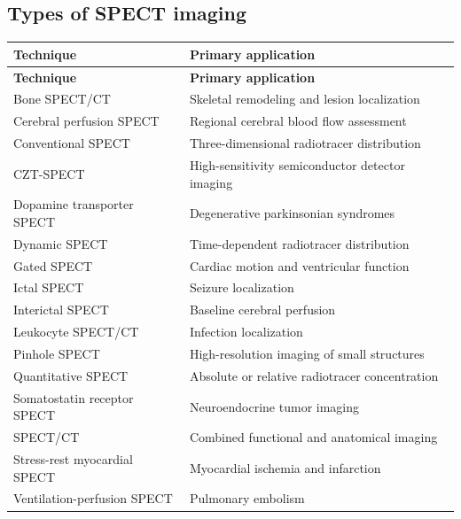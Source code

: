 \subsection{Types of SPECT imaging}
\begin{longtable}{@{}p{}p{}@{}}
\toprule
\textbf{Technique} & \textbf{Primary application} \\
\midrule
\endfirsthead
\toprule
\textbf{Technique} & \textbf{Primary application} \\
\midrule
\endhead
Bone SPECT/CT & Skeletal remodeling and lesion localization \\
Cerebral perfusion SPECT & Regional cerebral blood flow assessment \\
Conventional SPECT & Three-dimensional radiotracer distribution \\
CZT-SPECT & High-sensitivity semiconductor detector imaging \\
Dopamine transporter SPECT & Degenerative parkinsonian syndromes \\
Dynamic SPECT & Time-dependent radiotracer distribution \\
Gated SPECT & Cardiac motion and ventricular function \\
Ictal SPECT & Seizure localization \\
Interictal SPECT & Baseline cerebral perfusion \\
Leukocyte SPECT/CT & Infection localization \\
Pinhole SPECT & High-resolution imaging of small structures \\
Quantitative SPECT & Absolute or relative radiotracer concentration \\
Somatostatin receptor SPECT & Neuroendocrine tumor imaging \\
SPECT/CT & Combined functional and anatomical imaging \\
Stress-rest myocardial SPECT & Myocardial ischemia and infarction \\
Ventilation-perfusion SPECT & Pulmonary embolism \\
\bottomrule
\end{longtable}

